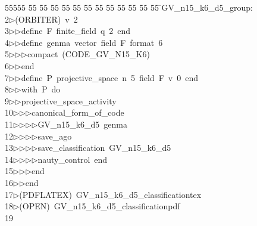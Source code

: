 %
%
\begin{tabbing}
55555 \= 55 \= 55 \= 55 \= 55 \= 55 \= 55 \= 55 \= 55 \= 55 \= 55 \= 55 \= 55 \= \>GV\_n15\_k6\_d5\_group:\\[0pt]
2\>$\triangleright$\>(ORBITER)\ v\ 2\ \\[0pt]
3\>$\triangleright$\>$\triangleright$\>define\ F\ finite\_field\ q\ 2\ end\ \\[0pt]
4\>$\triangleright$\>$\triangleright$\>define\ genma\ vector\ field\ F\ format\ 6\ \\[0pt]
5\>$\triangleright$\>$\triangleright$\>$\triangleright$\>compact\ (CODE\_GV\_N15\_K6)\ \\[0pt]
6\>$\triangleright$\>$\triangleright$\>end\ \\[0pt]
7\>$\triangleright$\>$\triangleright$\>define\ P\ projective\_space\ n\ 5\ field\ F\ v\ 0\ end\ \\[0pt]
8\>$\triangleright$\>$\triangleright$\>with\ P\ do\ \\[0pt]
9\>$\triangleright$\>$\triangleright$\>projective\_space\_activity\ \\[0pt]
10\>$\triangleright$\>$\triangleright$\>$\triangleright$\>canonical\_form\_of\_code\ \\[0pt]
11\>$\triangleright$\>$\triangleright$\>$\triangleright$\>$\triangleright$\>GV\_n15\_k6\_d5\ genma\ \\[0pt]
12\>$\triangleright$\>$\triangleright$\>$\triangleright$\>$\triangleright$\>save\_ago\ \\[0pt]
13\>$\triangleright$\>$\triangleright$\>$\triangleright$\>$\triangleright$\>save\_classification\ GV\_n15\_k6\_d5\ \\[0pt]
14\>$\triangleright$\>$\triangleright$\>$\triangleright$\>$\triangleright$\>nauty\_control\ end\ \\[0pt]
15\>$\triangleright$\>$\triangleright$\>$\triangleright$\>end\ \\[0pt]
16\>$\triangleright$\>$\triangleright$\>end\\[0pt]
17\>$\triangleright$\>(PDFLATEX)\ GV\_n15\_k6\_d5\_classificationtex\\[0pt]
18\>$\triangleright$\>(OPEN)\ GV\_n15\_k6\_d5\_classificationpdf\\[0pt]
19\>\end{tabbing}
